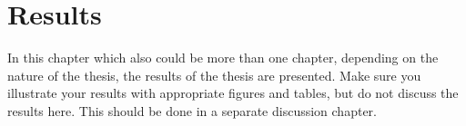 
\chapter{Results}
  \label{results}

In this chapter which also could be more than one chapter, depending on the nature of the thesis, the results of the thesis are presented.
Make sure you illustrate your results with appropriate figures and tables, but do not discuss the results here.
This should be done in a separate discussion chapter.

\clearpage
